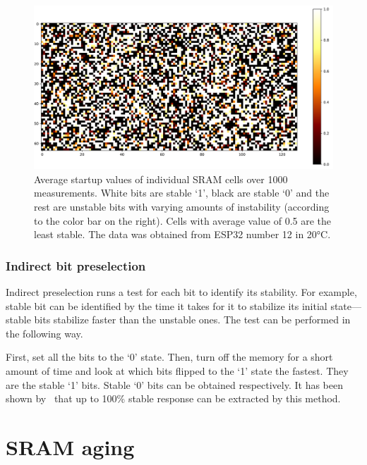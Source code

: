 \begin{figure}[ht!]
    \centering
    \captionsetup{justification=justified,margin=0.5cm}
    \includegraphics[width=\textwidth]{images/bit_stability.png}
    \caption[Average startup values of individual SRAM cells over 1000 measurements.]{Average startup values of individual SRAM cells over 1000 measurements. White bits are stable `1', black are stable `0' and the rest are unstable bits with varying amounts of instability (according to the color bar on the right). Cells with average value of 0.5 are the least stable. The data was obtained from ESP32 number 12 in 20°C.}
    \label{fig:bit_stability_mask}
\end{figure}

\subsubsection*{Indirect bit preselection}

Indirect preselection runs a test for each bit to identify its stability. For example, stable bit can be identified by the time it takes for it to stabilize its initial state---stable bits stabilize faster than the unstable ones. The test can be performed in the following way.

First, set all the bits to the `0' state. Then, turn off the memory for a short amount of time and look at which bits flipped to the `1' state the fastest. They are the stable `1' bits. Stable `0' bits can be obtained respectively. It has been shown by~\cite{Liu2017} that up to 100\% stable response can be extracted by this method.

\section{SRAM aging}

